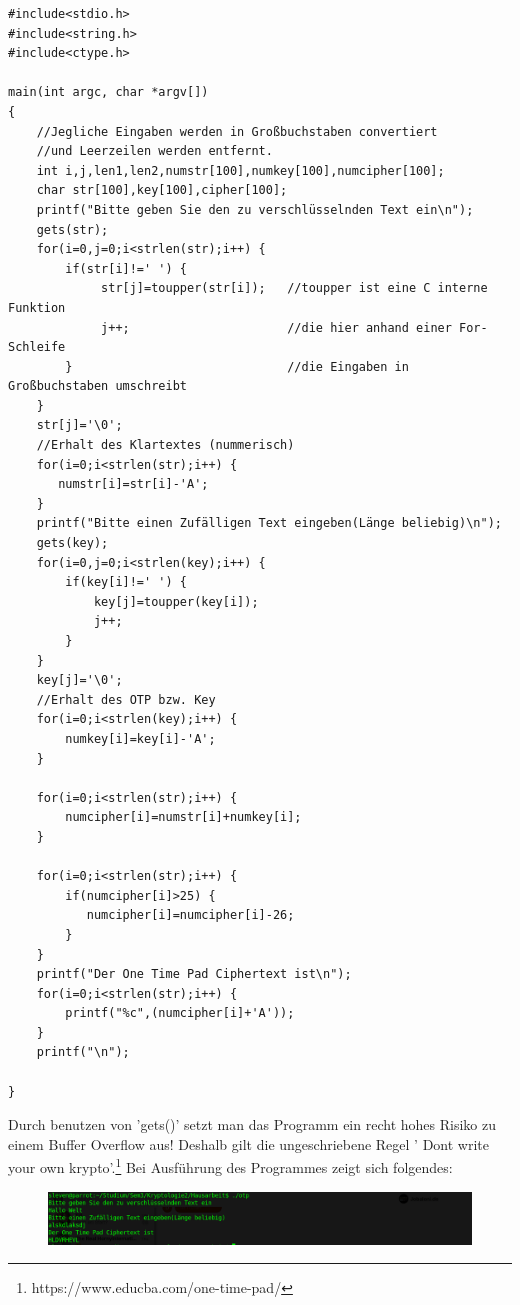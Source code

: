 \documentclass[a4paper,12pt]{scrartcl}
\begin{document}
\begin{verbatim}
#include<stdio.h>
#include<string.h>
#include<ctype.h>

main(int argc, char *argv[])
{
    //Jegliche Eingaben werden in Großbuchstaben convertiert 
    //und Leerzeilen werden entfernt.
    int i,j,len1,len2,numstr[100],numkey[100],numcipher[100];
    char str[100],key[100],cipher[100];
    printf("Bitte geben Sie den zu verschlüsselnden Text ein\n");
    gets(str);
    for(i=0,j=0;i<strlen(str);i++) {
        if(str[i]!=' ') {
             str[j]=toupper(str[i]);   //toupper ist eine C interne Funktion
             j++;                      //die hier anhand einer For-Schleife
        }                              //die Eingaben in Großbuchstaben umschreibt
    }
    str[j]='\0';
    //Erhalt des Klartextes (nummerisch)
    for(i=0;i<strlen(str);i++) {
       numstr[i]=str[i]-'A';    
    }   
    printf("Bitte einen Zufälligen Text eingeben(Länge beliebig)\n");
    gets(key);
    for(i=0,j=0;i<strlen(key);i++) {
        if(key[i]!=' ') {
            key[j]=toupper(key[i]);   
            j++;
        }
    }
    key[j]='\0';
    //Erhalt des OTP bzw. Key
    for(i=0;i<strlen(key);i++) {
        numkey[i]=key[i]-'A';    
    }  

    for(i=0;i<strlen(str);i++) {
        numcipher[i]=numstr[i]+numkey[i];
    }
   
    for(i=0;i<strlen(str);i++) {
        if(numcipher[i]>25) {
           numcipher[i]=numcipher[i]-26;
        }
    }
    printf("Der One Time Pad Ciphertext ist\n");
    for(i=0;i<strlen(str);i++) {
        printf("%c",(numcipher[i]+'A')); 
    }
    printf("\n");

}

\end{verbatim}

Durch benutzen von 'gets()' setzt man das Programm ein recht hohes Risiko zu einem Buffer Overflow aus! Deshalb gilt die ungeschriebene Regel ' Dont write your own krypto'.\footnote{https://www.educba.com/one-time-pad/}
Bei Ausführung des Programmes zeigt sich folgendes:
\begin{figure}[h]

\includegraphics[scale=0.41]{otp.png}     
\end{figure}


\newpage
\end{document}
